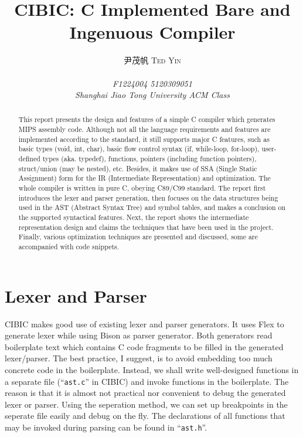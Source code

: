 \documentclass[10pt, a4paper]{article}
\begin{document}
\title{\Large{CIBIC: C Implemented Bare and Ingenuous Compiler}}

\author{\textsc{尹茂帆 Ted Yin}\\ \\
    {\centering\emph{F1224004 5120309051\\
Shanghai Jiao Tong University ACM Class}}}
\maketitle
\begin{abstract}
    This report presents the design and features of a simple C compiler which
    generates MIPS assembly code. Although not all the language requirements and
    features are implemented according to the standard, it still supports major
    C features, such as basic types (void, int, char), basic flow control syntax
    (if, while-loop, for-loop), user-defined types (aka. typedef), functions,
    pointers (including function pointers), struct/union (may be nested), etc.
    Besides, it makes use of SSA (Single Static Assignment) form for the IR
    (Intermediate Representation) and optimization. The whole compiler is
    written in pure C, obeying C89/C99 standard. The report first introduces the
    lexer and parser generation, then focuses on the data structures being used
    in the AST (Abstract Syntax Tree) and symbol tables, and makes a conclusion
    on the supported syntactical features. Next, the report shows the
    intermediate representation design and claims the techniques that have been
    used in the project. Finally, various optimization techniques are presented
    and discussed, some are accompanied with code snippets.
\end{abstract}
\tableofcontents
\section{Lexer and Parser}
CIBIC makes good use of existing lexer and parser generators. It uses Flex to
generate lexer while using Bison as parser generator. Both generators read
boilerplate text which contains C code fragments to be filled in the generated
lexer/parser. The best practice, I suggest, is to avoid embedding too much
concrete code in the boilerplate. Instead, we shall write well-designed
functions in a separate file (``\texttt{ast.c}'' in CIBIC) and invoke functions
in the boilerplate. The reason is that it is almost not practical nor convenient
to debug the generated lexer or parser. Using the seperation method, we can set
up breakpoints in the seperate file easily and debug on the fly. The
declarations of all functions that may be invoked during parsing can be found in
``\texttt{ast.h}''.
\end{document}
